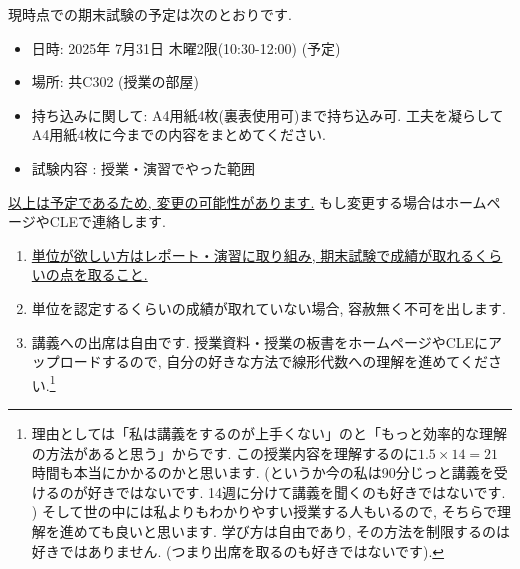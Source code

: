 \documentclass[dvipdfmx,a4paper,11pt]{article}
\theoremstyle{definition}
\begin{document}
\medskip
{}

現時点での期末試験の予定は次のとおりです. 
\begin{itemize}
  \setlength{\parskip}{0cm} 
  \setlength{\itemsep}{0cm}
\item 日時: 2025年 7月31日 木曜2限(10:30-12:00)  (予定)
\item 場所: 共C302 (授業の部屋)
\item 持ち込みに関して: A4用紙4枚(裏表使用可)まで持ち込み可. 工夫を凝らしてA4用紙4枚に今までの内容をまとめてください.
\item 試験内容 : 授業・演習でやった範囲
\end{itemize}
\underline{以上は予定であるため, 変更の可能性があります.} もし変更する場合はホームページやCLEで連絡します. 

\medskip
{}
\begin{enumerate}
  \setlength{\parskip}{0cm} 
  \setlength{\itemsep}{0cm} 
\item \underline{単位が欲しい方はレポート・演習に取り組み, 期末試験で成績が取れるくらいの点を取ること.} 
\item 単位を認定するくらいの成績が取れていない場合, 容赦無く不可を出します. 
\item 講義への出席は自由です. 授業資料・授業の板書をホームページやCLEにアップロードするので, 自分の好きな方法で線形代数への理解を進めてください.\footnote{理由としては「私は講義をするのが上手くない」のと「もっと効率的な理解の方法があると思う」からです. この授業内容を理解するのに$1.5 \times 14 = 21$時間も本当にかかるのかと思います. (というか今の私は90分じっと講義を受けるのが好きではないです.  14週に分けて講義を聞くのも好きではないです. ) そして世の中には私よりもわかりやすい授業する人もいるので, そちらで理解を進めても良いと思います. 学び方は自由であり, その方法を制限するのは好きではありません. (つまり出席を取るのも好きではないです).}
\end{enumerate}
\end{document}

